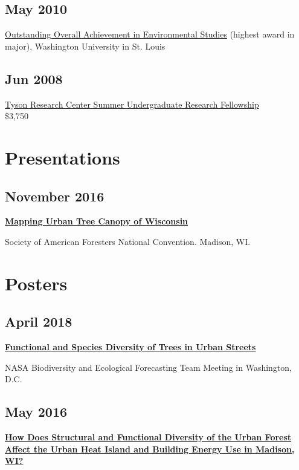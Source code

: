 \documentclass{article}
\begin{document}
\subsection*{May  2010}
\label{sec:org784b218}
\href{http://enst.wustl.edu/program/awards}{Outstanding Overall Achievement in Environmental Studies} (highest
award in major), Washington University in St. Louis

\subsection*{Jun 2008}
\label{sec:org5981831}
\href{http://tyson.wustl.edu/teaching-ugrad.php}{Tyson Research Center Summer Undergraduate Research Fellowship} \\
 \$3,750

\section*{Presentations}
\label{sec:org95a9ae6}
\subsection*{November 2016}
\label{sec:org1fd85fc}
\textbf{\href{http://pages.stat.wisc.edu/\~erker/Presentations/SAF\_20161105/saf\_presentation.html}{Mapping Urban Tree Canopy of Wisconsin}}

Society of American Foresters National Convention. Madison, WI.
\section*{Posters}
\label{sec:org57e8be1}
\subsection*{April 2018}
\label{sec:org0dd57e1}
\textbf{\href{http://pages.stat.wisc.edu/\~erker/Posters/NASA\_poster\_2018.jpg}{Functional and Species Diversity of Trees in Urban Streets}}

NASA Biodiversity and Ecological Forecasting Team Meeting in
Washington, D.C.
\subsection*{May 2016}
\label{sec:org6c512ed}
\textbf{\href{http://pages.stat.wisc.edu/\~erker/Posters/NASA\_poster\_2016.jp2}{How Does Structural and Functional Diversity of the Urban Forest
Affect the Urban Heat Island and Building Energy Use in Madison, WI?}}
\end{document}
